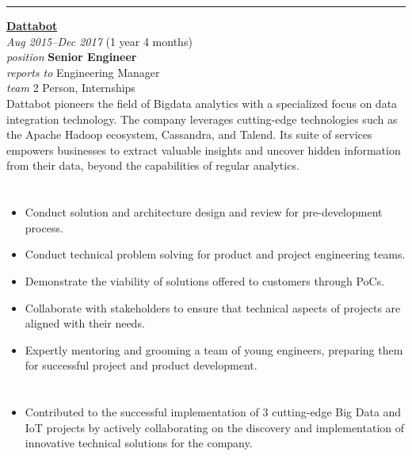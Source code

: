 \documentclass[12pt]{res}
\begin{document}
\begin{resume}
\vspace{10pt}
\rule{1.0\textwidth}{0.1pt}

\begin{multicols}{2}
	{\large {\bf \href{https://dattabot.io}{Dattabot}}} \\
	{\footnotesize{\sl Aug 2015--Dec 2017} \hfill (1 year 4 months)}\\
	{\footnotesize{\sl position} \hfill \bf{Senior Engineer}}\\
	{\footnotesize{\sl reports to} \hfill Engineering Manager}\\
	{\footnotesize{\sl team} \hfill 2 Person, Internships}\\

	\columnbreak
	{\footnotesize{Dattabot pioneers the field of Bigdata analytics with a specialized focus on data integration technology. The company leverages cutting-edge technologies such as the Apache Hadoop ecosystem, Cassandra, and Talend. Its suite of services empowers businesses to extract valuable insights and uncover hidden information from their data, beyond the capabilities of regular analytics.}}\\
\end{multicols}
\vspace{-20pt}

\begin{multicols}{2}
	\section{}
		\begin{itemize}
			\item Conduct solution and architecture design and review for pre-development process.

\item Conduct technical problem solving for product and project engineering teams.

\item Demonstrate the viability of solutions offered to customers through PoCs.

\item Collaborate with stakeholders to ensure that technical aspects of projects are aligned with their needs.

\item Expertly mentoring and grooming a team of young engineers, preparing them for successful project and product development.
		\end{itemize}
	\section{}
		\begin{itemize}
			\setlength{\itemindent}{0pt}
			\item Contributed to the successful implementation of 3 cutting-edge Big Data and IoT projects by actively collaborating on the discovery and implementation of innovative technical solutions for the company.


\end{itemize}
\end{multicols}
\end{resume}
\end{document}
